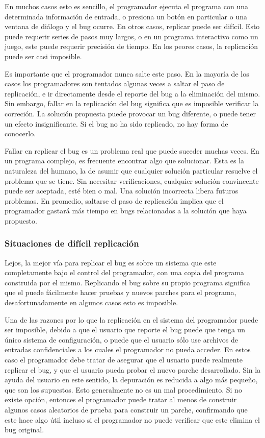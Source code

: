 \documentclass[12pt,legalpaper]{report}
\begin{document}
En muchos casos esto es sencillo, el programador ejecuta el programa con una determinada información de entrada, o presiona un botón en particular o una ventana de diálogo y el bug ocurre.  En otros casos, replicar puede ser difícil.  Esto puede requerir series de pasos muy largos, o en un programa interactivo como un juego, este puede requerir precisión de tiempo.  En los peores casos, la replicación puede ser casi imposible.

Es importante que el programador nunca salte este paso.  En la mayoría de los casos los programadores son tentados algunas veces  a saltar el paso de replicación, e ir directamente desde el reporte del bug a la eliminación del mismo.  Sin embargo, fallar en la replicación del bug significa que es imposible verificar la correción.  La solución propuesta puede provocar un bug diferente, o puede tener un efecto insignificante.  Si el bug no ha sido replicado, no hay forma de conocerlo.

Fallar en replicar el bug es un problema real que puede suceder muchas veces.  En un programa complejo, es frecuente encontrar algo que solucionar.  Esta es la naturaleza del humano, la de asumir que cualquier solución particular resuelve el problema que se tiene.  Sin necesitar verificaciones, cualquier solución convincente puede ser aceptada, esté bien o mal.  Una solución incorrecta libera futuros problemas.  En promedio, saltarse el paso de replicación implica que el programador gastará más tiempo en bugs relacionados a la solución que haya propuesto.


\subsubsection{Situaciones de difícil replicación}

Lejos, la mejor vía para replicar el bug es sobre un sistema que este completamente bajo el control del programador, con una copia del programa construida por el mismo.  Replicando el bug sobre su propio programa significa que el puede fácilmente hacer pruebas y nuevos parches para el programa, desafortunadamente en algunos casos esto es imposible.

Una de las razones por lo que la replicación en el sistema del programador puede ser imposible, debido a que el usuario que reporte el bug puede que tenga un único sistema de configuración, o puede que el usuario sólo use archivos de entradas confidenciales a los cuales el programador no pueda acceder.  En estos caso el programador debe tratar de asegurar que el usuario puede realmente replicar el bug, y que el usuario pueda probar el nuevo parche desarrollado.  Sin la ayuda del usuario en este sentido, la depuración es reducida a algo más pequeño, que son los supuestos.  Esto generalmente no es un mal procedimiento.  Si no existe opción, entonces el programador puede tratar al menos de construir algunos casos aleatorios de prueba para construir un parche, confirmando que este hace algo útil incluso si el programador no puede verificar que este elimina el bug original.
\end{document}
